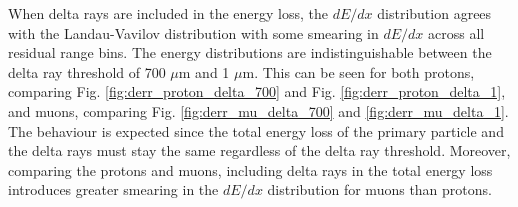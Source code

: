 When delta rays are included in the energy loss, the $dE/dx$ distribution agrees with the Landau-Vavilov distribution with some smearing in $dE/dx$ across all residual range bins.
The energy distributions are indistinguishable between the delta ray threshold of 700 $\mu$m and 1 $\mu$m.
This can be seen for both protons, comparing Fig. \ref{fig:derr_proton_delta_700} and Fig. \ref{fig:derr_proton_delta_1}, and muons, comparing Fig. \ref{fig:derr_mu_delta_700} and \ref{fig:derr_mu_delta_1}. 
The behaviour is expected since the total energy loss of the primary particle and the delta rays must stay the same regardless of the delta ray threshold.
Moreover, comparing the protons and muons, including delta rays in the total energy loss introduces greater smearing in the $dE/dx$ distribution for muons than protons.

